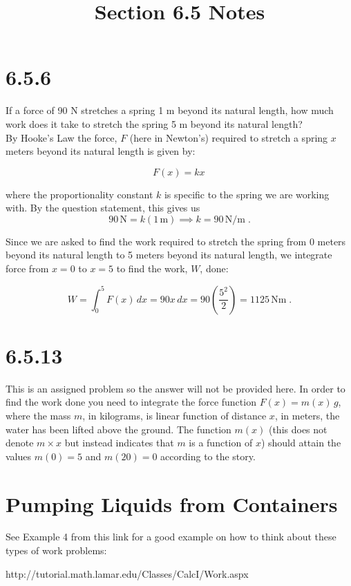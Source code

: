 \documentclass[11pt]{article}
\title{Section 6.5 Notes}
\begin{document}
\maketitle

\section*{6.5.6}

If a force of 90 N stretches a spring 1 m beyond its natural length, how much work does it take to stretch the spring 5 m beyond its natural length?\\

By Hooke's Law the force, $F$ (here in Newton's) required to stretch a spring $x$ meters beyond its natural length is given by:

$$F(x) = kx \,$$

where the proportionality constant $k$ is specific to the spring we are working with. By the question statement, this gives us $$
90 \,\text{N} = k (1 \, \text{m}) \implies k = 90\, \text{N/m} \;.$$

Since we are asked to find the work required to stretch the spring from 0 meters beyond its natural length to 5 meters beyond its natural length, we integrate force from $x = 0$ to $x = 5$ to find the work, $W$, done:

$$W = \int_{0}^{5} F(x) \, dx = 90x \,dx = 90(\frac{5^2}{2}) = 1125 \, \text{Nm} \;.$$

\section*{6.5.13}

This is an assigned problem so the answer will not be provided here. In order to find the work done you need to integrate the force function $F(x) = m(x) \, g$, where the mass $m$, in kilograms, is linear function of distance $x$, in meters, the water has been lifted above the ground. The function $m(x)$ (this does not denote $m\times x$ but instead indicates that $m$ is a function of $x$) should attain the values $m(0) = 5$ and $m(20) = 0$ according to the story. 

\section*{Pumping Liquids from Containers}

See Example 4 from this link for a good example on how to think about these types of work problems:

http://tutorial.math.lamar.edu/Classes/CalcI/Work.aspx
\end{document}
